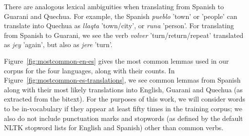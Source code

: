There are analogous lexical ambiguities when translating from Spanish to
Guarani and Quechua.
For example, the Spanish \emph{pueblo} 'town' or 'people' can translate into
Quechua as \emph{llaqta} 'town/city', or \emph{runa} 'person'.
For translating from Spanish to Guarani, we see the verb \emph{volver}
'turn/return/repeat' translated as \emph{jey} 'again', but also as \emph{jere}
'turn'.

Figure~\ref{fig:mostcommon-en-es} gives the most common lemmas used in our
corpus for the four languages, along with their counts. In
Figure~\ref{fig:mostcommon-es-translations}, we see common lemmas from
Spanish along with their most likely translations into English, Guarani and
Quechua (as extracted from the bitext). For the purposes of this work, we will
consider words to be in-vocabulary if they appear at least fifty times in the
training corpus; we also do not include punctuation marks and stopwords (as
defined by the default NLTK stopword lists for English and Spanish) other than
common verbs.


